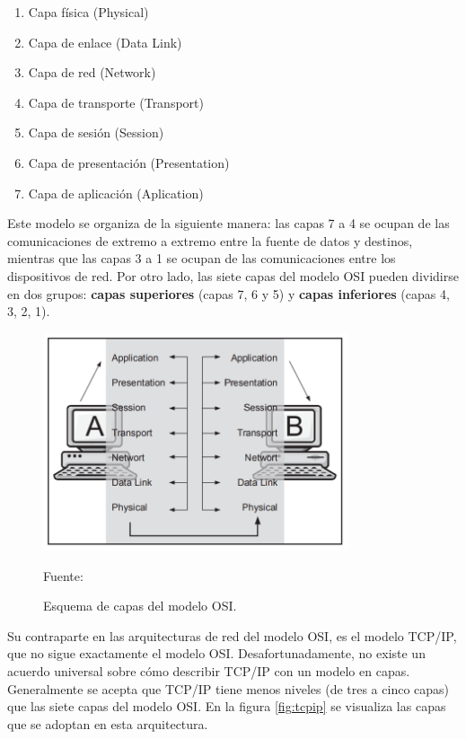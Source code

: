 \begin{enumerate}
    \item Capa física (Physical)
    \item Capa de enlace (Data Link)
    \item Capa de red (Network)
    \item Capa de transporte (Transport)
    \item Capa de sesión (Session)
    \item Capa de presentación (Presentation)
    \item Capa de aplicación (Aplication)
\end{enumerate}

Este modelo se organiza de la siguiente manera: las capas 7 a 4 se ocupan de las comunicaciones de extremo a extremo entre la fuente de datos y destinos, mientras que las capas 3 a 1 se ocupan de las comunicaciones entre los dispositivos de red. Por otro lado, las siete capas del modelo OSI pueden dividirse en dos grupos: \textbf{capas superiores} (capas 7, 6 y 5) y \textbf{capas inferiores} (capas 4, 3, 2, 1).\\

\begin{figure}[H]
    \begin{center}
        \includegraphics[width=9cm]{img/capitulo_2/capas.png}
        \caption{Esquema de capas del modelo OSI.\\}
        Fuente: \protect\cite[3]{networkProtocolos:handbook}
        \label{fig:osi}
    \end{center}
\end{figure}

Su contraparte en las arquitecturas de red del modelo OSI, es el modelo TCP/IP, que no sigue exactamente el modelo OSI. Desafortunadamente, no existe un acuerdo universal sobre cómo describir TCP/IP con un modelo en capas. Generalmente se acepta que TCP/IP tiene menos niveles (de tres a cinco capas) que las siete capas del modelo OSI. En la figura \ref{fig:tcpip} se visualiza las capas que se adoptan en esta arquitectura. 

